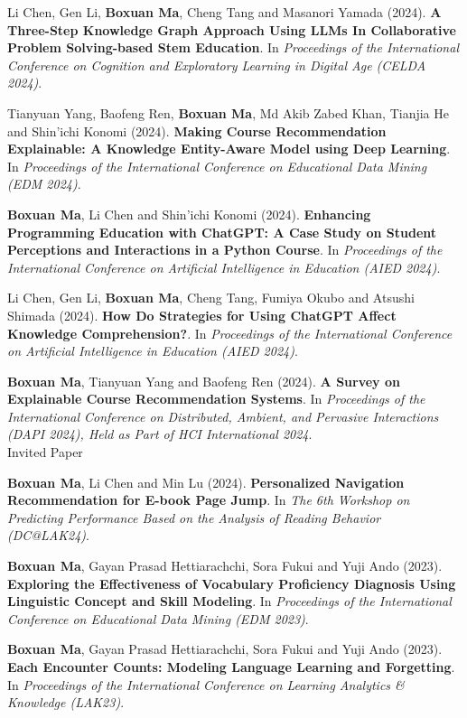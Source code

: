 \documentclass[a4paper,11pt]{article}
\begin{document}
\item[\textbf{[C.15]}] Li Chen, Gen Li, \textbf{Boxuan Ma}, Cheng Tang and Masanori Yamada (2024). \textbf{A Three-Step Knowledge Graph Approach Using LLMs In Collaborative Problem Solving-based Stem Education}. In \textit{Proceedings of the International Conference on Cognition and Exploratory Learning in Digital Age (CELDA 2024)}.
\item[\textbf{[C.14]}] Tianyuan Yang, Baofeng Ren, \textbf{Boxuan Ma}, Md Akib Zabed Khan, Tianjia He and Shin'ichi Konomi (2024). \textbf{Making Course Recommendation Explainable: A Knowledge Entity-Aware Model using Deep Learning}. In \textit{Proceedings of the International Conference on Educational Data Mining (EDM 2024)}.
\item[\textbf{[C.13]}] \textbf{Boxuan Ma}, Li Chen and Shin'ichi Konomi (2024). \textbf{Enhancing Programming Education with ChatGPT: A Case Study on Student Perceptions and Interactions in a Python Course}. In \textit{Proceedings of the International Conference on Artificial Intelligence in Education (AIED 2024)}.
\item[\textbf{[C.12]}] Li Chen, Gen Li, \textbf{Boxuan Ma}, Cheng Tang, Fumiya Okubo and Atsushi Shimada (2024). \textbf{How Do Strategies for Using ChatGPT Affect Knowledge Comprehension?}. In \textit{Proceedings of the International Conference on Artificial Intelligence in Education (AIED 2024)}.
\item[\textbf{[C.11]}] \textbf{Boxuan Ma}, Tianyuan Yang and Baofeng Ren (2024). \textbf{A Survey on Explainable Course Recommendation Systems}. In \textit{Proceedings of the International Conference on Distributed, Ambient, and Pervasive Interactions (DAPI 2024), Held as Part of HCI International 2024}. \\ \textcolor{red!80!black}{Invited Paper}
\item[\textbf{[C.10]}] \textbf{Boxuan Ma}, Li Chen and Min Lu (2024). \textbf{Personalized Navigation Recommendation for E-book Page Jump}. In \textit{The 6th Workshop on Predicting Performance Based on the Analysis of Reading Behavior (DC@LAK24)}.
\item[\textbf{[C.9]}] \textbf{Boxuan Ma}, Gayan Prasad Hettiarachchi, Sora Fukui and Yuji Ando (2023). \textbf{Exploring the Effectiveness of Vocabulary Proficiency Diagnosis Using Linguistic Concept and Skill Modeling}. In \textit{Proceedings of the International Conference on Educational Data Mining (EDM 2023)}.
\item[\textbf{[C.8]}] \textbf{Boxuan Ma}, Gayan Prasad Hettiarachchi, Sora Fukui and Yuji Ando (2023). \textbf{Each Encounter Counts: Modeling Language Learning and Forgetting}. In \textit{Proceedings of the International Conference on Learning Analytics \& Knowledge (LAK23)}.
\end{document}
